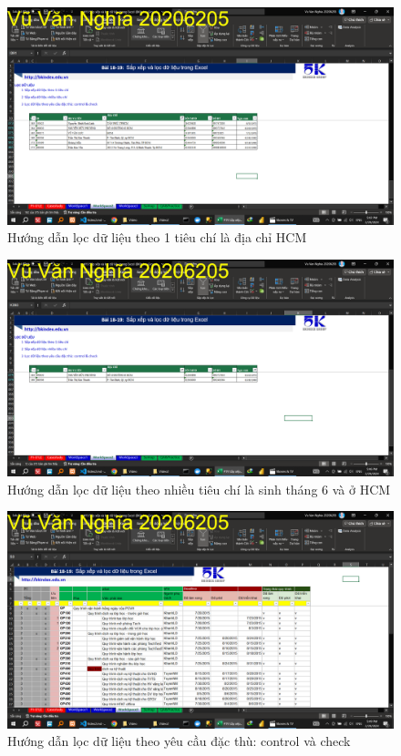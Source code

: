 \documentclass{article}
\begin{document}
\begin{figure}[h]
\centering
\includegraphics[scale = 0.15]{Video2/HuongDan/4.png}
\caption{Hướng dẫn lọc dữ liệu theo 1 tiêu chí là địa chỉ HCM}
\end{figure}

\begin{figure}[h]
\centering
\includegraphics[scale = 0.15]{Video2/HuongDan/5.png}
\caption{Hướng dẫn lọc dữ liệu theo nhiều tiêu chí là sinh tháng 6 và ở HCM}
\end{figure}

\begin{figure}[h]
\centering
\includegraphics[scale = 0.15]{Video2/HuongDan/6.png}
\caption{Hướng dẫn lọc dữ liệu theo yêu cầu đặc thù: control và check}
\end{figure}
\end{document}
